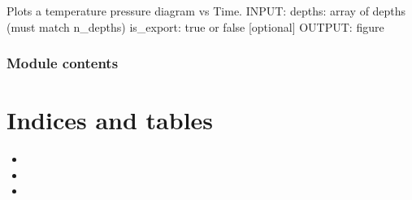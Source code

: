 \documentclass[letterpaper,10pt,english]{sphinxmanual}
\begin{document}
\begin{fulllineitems}

\begin{fulllineitems}
\label{\detokenize{tscw_module:tscw_module.thermreg_DataClasses.ThermregData.plot_tp_vs_time}}
\pysigstartsignatures
{}
\pysigstopsignatures
\sphinxAtStartPar
Plots a temperature \sphinxhyphen{} pressure diagram vs Time.
INPUT:
depths: array of depths (must match n\_depths)
is\_export: true or false {[}optional{]}
OUTPUT:
figure

\end{fulllineitems}


\end{fulllineitems}



\subsection{Module contents}
\label{\detokenize{tscw_module:module-tscw_module}}\label{\detokenize{tscw_module:module-contents}}

\chapter{Indices and tables}
\label{\detokenize{index:indices-and-tables}}\begin{itemize}
\item {} 
\sphinxAtStartPar
{}

\item {} 
\sphinxAtStartPar
{}

\item {} 
\sphinxAtStartPar
{}

\end{itemize}
\end{document}
